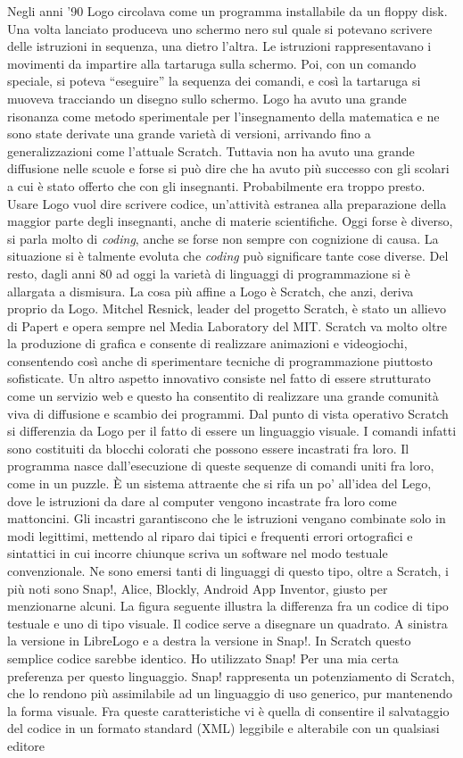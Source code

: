 Negli anni '90 Logo circolava come un programma installabile da un floppy disk. Una volta lanciato produceva uno schermo nero sul quale si potevano scrivere delle istruzioni in sequenza, una dietro l'altra. Le istruzioni rappresentavano i movimenti da impartire alla tartaruga sulla schermo. Poi, con un comando speciale, si poteva “eseguire” la sequenza dei comandi, e così la tartaruga si muoveva tracciando un disegno sullo schermo. Logo ha avuto una grande risonanza come metodo sperimentale per l'insegnamento della matematica e ne sono state derivate una grande varietà di versioni, arrivando fino a generalizzazioni come l'attuale Scratch. Tuttavia non ha avuto una grande diffusione nelle scuole e forse si può dire che ha avuto più successo con gli scolari a cui è stato offerto che con gli insegnanti. Probabilmente era troppo presto. Usare Logo vuol dire scrivere codice, un'attività estranea alla preparazione della maggior parte degli insegnanti, anche di materie scientifiche. Oggi forse è diverso, si parla molto di \textit{coding}, anche se forse non sempre con cognizione di causa. La situazione si è talmente evoluta che \textit{coding} può significare tante cose diverse. Del resto, dagli anni 80 ad oggi la varietà di linguaggi di programmazione si è allargata a dismisura. La cosa più affine a Logo è Scratch, che anzi, deriva proprio da Logo. Mitchel Resnick, leader del progetto Scratch, è stato un allievo di Papert e opera sempre nel Media Laboratory del MIT. Scratch va molto oltre la produzione di grafica e consente di realizzare animazioni e videogiochi, consentendo così anche di sperimentare tecniche di programmazione piuttosto sofisticate. Un altro aspetto innovativo consiste nel fatto di essere strutturato come un servizio web e questo ha consentito di realizzare una grande comunità viva di diffusione e scambio dei programmi. Dal punto di vista operativo Scratch si differenzia da Logo per il fatto di essere un linguaggio visuale. I comandi infatti sono costituiti da blocchi colorati che possono essere incastrati fra loro. Il programma nasce dall'esecuzione di queste sequenze di comandi uniti fra loro, come in un puzzle. È un sistema attraente che si rifa un po' all'idea del Lego, dove le istruzioni da dare al computer vengono incastrate fra loro come mattoncini. Gli incastri garantiscono che le istruzioni vengano combinate solo in modi legittimi, mettendo al riparo dai tipici e frequenti errori ortografici e sintattici in cui incorre chiunque scriva un software nel modo testuale convenzionale. Ne sono emersi tanti di linguaggi di questo tipo, oltre a Scratch, i più noti sono Snap!, Alice, Blockly, Android App Inventor, giusto per menzionarne alcuni. La figura seguente illustra la differenza fra un codice di tipo testuale e uno di tipo visuale. Il codice serve a disegnare un quadrato. A sinistra la versione in LibreLogo e a destra la versione in Snap!. In Scratch questo semplice codice sarebbe identico. Ho utilizzato Snap! Per una mia certa preferenza per questo linguaggio. Snap! rappresenta un potenziamento di Scratch, che lo rendono più assimilabile ad un linguaggio di uso generico, pur mantenendo la forma visuale. Fra queste caratteristiche vi è quella di consentire il salvataggio del codice in un formato standard (XML) leggibile e alterabile con un qualsiasi editore 